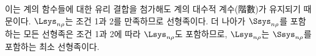 
이는 계의 함수들에 대한 유리 결합을 첨가해도 계의 대수적 계수(階數)가 유지되기 때문이다. $\Lsys_{n\rho}$는 조건 1과 2를 만족하므로 선형족이다. 더 나아가 $\Ssys_{n\rho}$를 포함하는 모든 선형족은 조건 1과 2에 따라 $\Lsys_{n\rho}$도 포함하므로, $\Lsys_{n\rho}$는 $\Ssys_{n\rho}$를 포함하는 최소 선형족이다.
